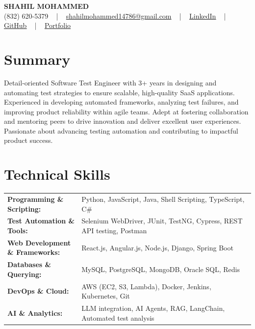\documentclass[letterpaper,11pt]{article}
\begin{document}
\begin{center}
    {\fontsize{14pt}{12pt}\selectfont \textbf{\MakeUppercase{Shahil Mohammed}}}\\ \vspace{2pt}
    \fontsize{10pt}{12pt}\selectfont (832) 620-5379 ~ | ~ \href{mailto:shahilmohammed14786@gmail.com}{shahilmohammed14786@gmail.com} ~ | ~  
    \href{https://www.linkedin.com/in/shahil-mohammed-9652931a1/}{\color{blue}\underline{LinkedIn}}  ~ | ~ 
    \href{https://github.com/freakbeast14}{\color{blue}\underline{GitHub}} ~ | ~ 
    \href{https://shahil-mohammed.netlify.app/}{\color{blue}\underline{Portfolio}}
    \vspace{-8pt}
\end{center}

\section{Summary}
\fontsize{9pt}{10pt}\selectfont
Detail-oriented Software Test Engineer with 3+ years in designing and automating test strategies to ensure scalable, high-quality SaaS applications. Experienced in developing automated frameworks, analyzing test failures, and improving product reliability within agile teams. Adept at fostering collaboration and mentoring peers to drive innovation and deliver excellent user experiences. Passionate about advancing testing automation and contributing to impactful product success.
 \vspace{-5pt}
 
\section{Technical Skills}
        \vspace{-14pt}
        \begin{table}[h]
            \fontsize{9pt}{10pt}\selectfont
            \begin{tabular}{p{0.3\linewidth} p{0.7\linewidth}}
                \textbf{Programming \& Scripting:} & Python, JavaScript, Java, Shell Scripting, TypeScript, C\# \\
                \textbf{Test Automation \& Tools:} & Selenium WebDriver, JUnit, TestNG, Cypress, REST API testing, Postman \\
                \textbf{Web Development \& Frameworks:} & React.js, Angular.js, Node.js, Django, Spring Boot \\
                \textbf{Databases \& Querying:} & MySQL, PostgreSQL, MongoDB, Oracle SQL, Redis \\
                \textbf{DevOps \& Cloud:} & AWS (EC2, S3, Lambda), Docker, Jenkins, Kubernetes, Git \\
                \textbf{AI \& Analytics:} & LLM integration, AI Agents, RAG, LangChain, Automated test analysis \\
            \end{tabular}
        \end{table}
 \vspace{-15pt}
 
\end{document}

